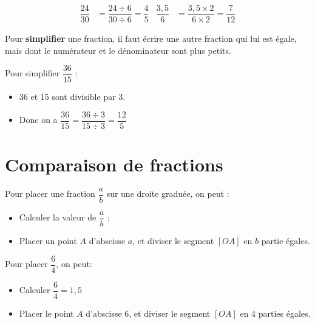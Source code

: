\documentclass[a4paper,11pt]{article}
\begin{document}
\begin{exemple}
	\begin{align*}
		\dfrac{24}{30} & = \dfrac{24 ÷ 6}{30 ÷ 6} = \dfrac{4}{5}  &
		\dfrac{3,5}{6} & = \dfrac{3,5 × 2}{6 × 2} = \dfrac{7}{12}
	\end{align*}
\end{exemple}

\begin{cours}
	Pour \textbf{simplifier} une fraction, il faut écrire une autre fraction qui lui est égale, mais dont le numérateur et le dénominateur sont plus petits.
\end{cours}

\begin{exemple}
	Pour simplifier $\dfrac{36}{15}$ :
	\begin{itemize}
		\item 36 et 15 sont divisible par 3.
		\item Donc on a $\dfrac{36}{15} = \dfrac{36 ÷ 3}{15 ÷ 3} = \dfrac{12}{5}$
	\end{itemize}
\end{exemple}

\section{Comparaison de fractions}

\begin{cours}
	Pour placer une fraction $\dfrac{a}{b}$ sur une droite graduée, on peut :
	\begin{itemize}
		\item Calculer la valeur de $\dfrac{a}{b}$ ;
		\item Placer un point $A$ d'abscisse $a$, et diviser le segment $[OA]$ en $b$ partie égales.
	\end{itemize}
\end{cours}

\begin{exemple}
	Pour placer $\dfrac{6}{4}$, on peut:
	\begin{itemize}
		\item Calculer $\dfrac{6}{4} = 1,5$
		\item Placer le point $A$ d'abscisse 6, et diviser le segment $[OA]$ en 4 parties égales.
	\end{itemize}

	\vspace{0.7em}

\end{exemple}
\end{document}
